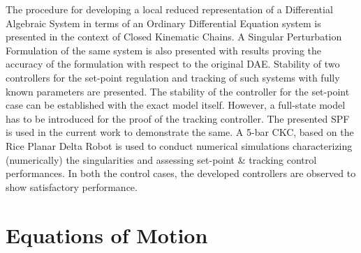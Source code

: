 \documentclass[10pt,final,journal,letterpaper,oneside,twocolumn]{IEEEtran}
\begin{document}
The procedure for developing a local reduced representation of a
Differential Algebraic System in terms of an Ordinary Differential
Equation system is presented in the context of Closed Kinematic
Chains. A Singular Perturbation Formulation of the same system is also
presented with results proving the accuracy of the formulation with
respect to the original DAE. Stability of two controllers for the
set-point regulation and tracking of such systems with fully known
parameters are presented. The stability of the controller for the
set-point case can be established with the exact model
itself. However, a full-state model has to be introduced for the proof
of the tracking controller. The presented SPF is used in the current
work to demonstrate the same. A 5-bar CKC, based on the Rice Planar
Delta Robot is used to conduct numerical simulations characterizing
(numerically) the singularities and assessing set-point \& tracking
control performances. In both the control cases, the developed
controllers are observed to show satisfactory performance.


\appendix{}

\section{Equations of Motion}
\label{sec:equations-motion}
\end{document}
